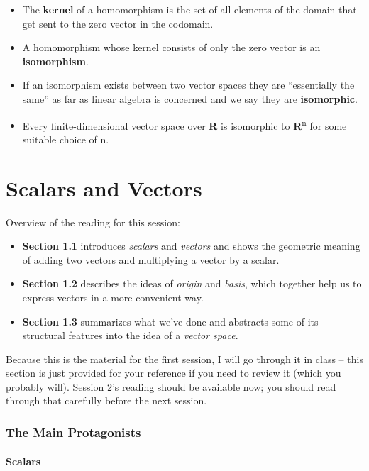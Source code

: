 \documentclass[oneside,english]{amsbook}
\numberwithin{section}{chapter}
\theoremstyle{plain}
\theoremstyle{definition}
\begin{document}
\begin{itemize}
	\begin{itemize}
		\item
		The \textbf{kernel} of a homomorphism is the set of all elements of
		the domain that get sent to the zero vector in the codomain.
		\item
		A homomorphism whose kernel consists of only the zero vector is an
		\textbf{isomorphism}.
		\item
		If an isomorphism exists between two vector spaces they are
		``essentially the same'' as far as linear algebra is concerned and
		we say they are \textbf{isomorphic}.
		\item
		Every finite-dimensional vector space over \textbf{R} is isomorphic
		to \textbf{R}\textsuperscript{n} for some suitable choice of n.
	\end{itemize}
\end{itemize}

\chapter{Scalars and Vectors}

Overview of the reading for this session:

\begin{itemize}
	\item
	\textbf{Section 1.1} introduces \emph{scalars} and \emph{vectors} and
	shows the geometric meaning of adding two vectors and multiplying a
	vector by a scalar.
	\item
	\textbf{Section 1.2} describes the ideas of \emph{origin} and
	\emph{basis}, which together help us to express vectors in a more
	convenient way.
	\item
	\textbf{Section 1.3} summarizes what we've done and abstracts some of
	its structural features into the idea of a \emph{vector space}.
\end{itemize}

Because this is the material for the first session, I will go through it
in class -- this section is just provided for your reference if you need
to review it (which you probably will). Session 2's reading should be
available now; you should read through that carefully before the next
session.

\subsection{The Main Protagonists}

\subsubsection{Scalars}
\end{document}
